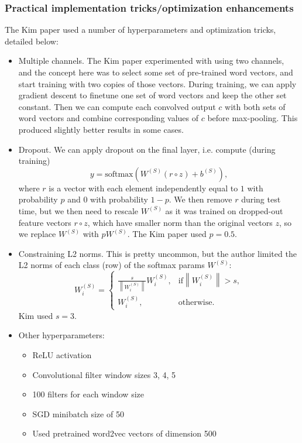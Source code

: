 \subsubsection{Practical implementation tricks/optimization enhancements}
The Kim paper used a number of hyperparameters and optimization tricks, detailed below:
\begin{itemize}
\item Multiple channels. The Kim paper experimented with using two channels, and the concept here was to select some set of pre-trained word vectors, and start training with two copies of those vectors. During training, we can apply gradient descent to finetune one set of word vectors and keep the other set constant. Then we can compute each convolved output $c$ with both sets of word vectors and combine corresponding values of $c$ before max-pooling. This produced slightly better results in some cases.
\item Dropout. We can apply dropout on the final layer, i.e. compute (during training)
$$y = \text{softmax}\left(W^{(S)}(r \circ z) + b^{(S)}\right),$$
where $r$ is a vector with each element independently equal to $1$ with probability $p$ and $0$ with probability $1-p$. We then remove $r$ during test time, but we then need to rescale $W^{(S)}$ as it was trained on dropped-out feature vectors $r \circ z$, which have smaller norm than the original vectors $z$, so we replace $W^{(S)}$ with $pW^{(S)}$. The Kim paper used $p = 0.5$.
\item Constraining L2 norms. This is pretty uncommon, but the author limited the L2 norms of each class (row) of the softmax params $W^{(S)}$:
\begin{equation*}
W_i^{(S)} = 
\begin{cases}
\frac{s}{\left\|W_i^{(S)}\right\|}W_i^{(S)}, &\text{if} \left\|W_i^{(S)}\right\| > s,\\
W_i^{(S)}, &\text{otherwise.} 
\end{cases}
\end{equation*}
Kim used $s = 3$.
\item Other hyperparameters:
\begin{itemize}
\item ReLU activation
\item Convolutional filter window sizes 3, 4, 5
\item 100 filters for each window size
\item SGD minibatch size of 50
\item Used pretrained word2vec vectors of dimension 500
\end{itemize}
\end{itemize}

